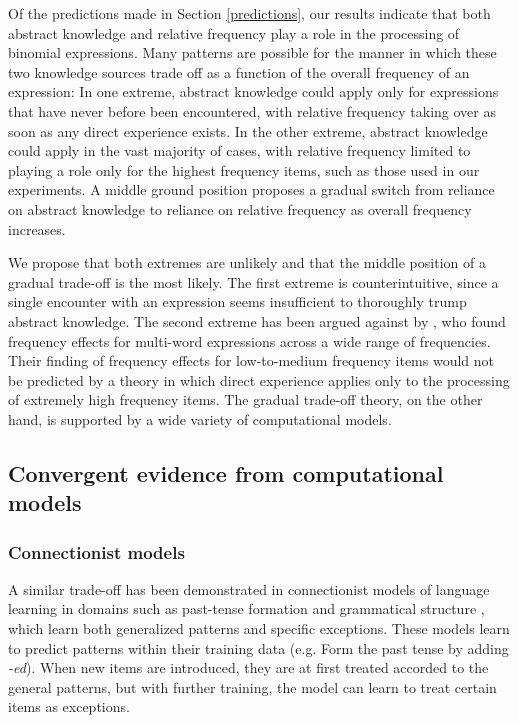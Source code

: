 \documentclass[authoryear]{elsarticle}
\begin{document}
Of the predictions made in Section \ref{predictions}, our results indicate that both abstract knowledge and relative frequency play a role in the processing of binomial expressions. Many patterns are possible for the manner in which these two knowledge sources trade off as a function of the overall frequency of an expression: In one extreme, abstract knowledge could apply only for expressions that have never before been encountered, with relative frequency taking over as soon as any direct experience exists. In the other extreme, abstract knowledge could apply in the vast majority of cases, with relative frequency limited to playing a role only for the highest frequency items, such as those used in our experiments. A middle ground position proposes a gradual switch from reliance on abstract knowledge to reliance on relative frequency as overall frequency increases.

We propose that both extremes are unlikely and that the middle position of a gradual trade-off is the most likely. The first extreme is counterintuitive, since a single encounter with an expression seems insufficient to thoroughly trump abstract knowledge. The second extreme has been argued against by \citet{Arnon:2010hz}, who found frequency effects for multi-word expressions across a wide range of frequencies. Their finding of frequency effects for low-to-medium frequency items would not be predicted by a theory in which direct experience applies only to the processing of extremely high frequency items. The gradual trade-off theory, on the other hand, is supported by a wide variety of computational models.

\subsection{Convergent evidence from computational models}
\subsubsection{Connectionist models}
A similar trade-off has been demonstrated in connectionist models of language learning in domains such as past-tense formation \citep{Rumelhart:1986wx} and grammatical structure \citep{Elman:2003vo}, which learn both generalized patterns and specific exceptions. These models learn to predict patterns within their training data (e.g. Form the past tense by adding \emph{-ed}). When new items are introduced, they are at first treated accorded to the general patterns, but with further training, the model can learn to treat certain items as exceptions.
\end{document}

